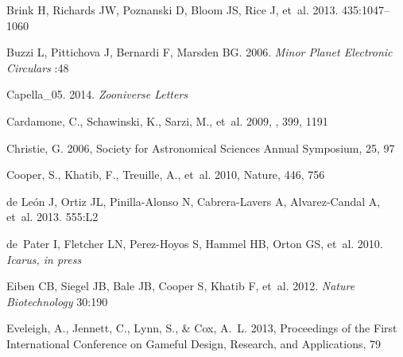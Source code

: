 \documentclass{ar2e}
\begin{document}
\begin{thebibliography}{}
{Brink} H, {Richards} JW, {Poznanski} D, {Bloom} JS, {Rice} J, et~al. 2013.
\newblock \textit{\mnras} 435:1047--1060

{Buzzi} L, {Pittichova} J, {Bernardi} F, {Marsden} BG. 2006.
\newblock \textit{Minor Planet Electronic Circulars} :48

{Capella\_05}. 2014.
\newblock \textit{Zooniverse Letters}

{Cardamone}, C., {Schawinski}, K., {Sarzi}, M., {et~al.} 2009, \mnras, 399,
  1191

{Christie}, G. 2006, Society for Astronomical Sciences Annual Symposium, 25, 97

{Cooper}, S., {Khatib}, F., {Treuille}, A., {et~al.} 2010, {Nature}, 446, 756

{de Le{\'o}n} J, {Ortiz} JL, {Pinilla-Alonso} N, {Cabrera-Lavers} A,
  {Alvarez-Candal} A, et~al. 2013.
\newblock \textit{\aap} 555:L2

de~Pater I, Fletcher LN, Perez-Hoyos S, Hammel HB, Orton GS, et~al. 2010.
\newblock \textit{Icarus, in press}

{Eiben} CB, {Siegel} JB, {Bale} JB, {Cooper} S, {Khatib} F, et~al. 2012.
\newblock \textit{{Nature Biotechnology}} 30:190

{Eveleigh}, A., {Jennett}, C., {Lynn}, S., \& {Cox}, A.~L. 2013, {Proceedings
  of the First International Conference on Gameful Design, Research, and
  Applications}, 79


\end{thebibliography}
\end{document}
